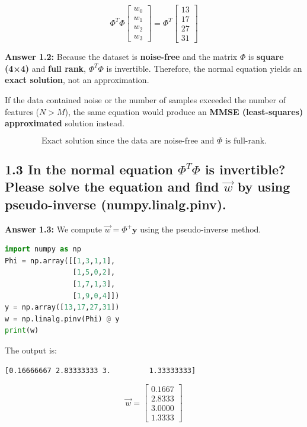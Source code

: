 \documentclass[12pt]{article}
\begin{document}
\[
\Phi^T \Phi 
\begin{bmatrix}
w_0 \\ w_1 \\ w_2 \\ w_3
\end{bmatrix}
=
\Phi^T
\begin{bmatrix}
13 \\ 17 \\ 27 \\ 31
\end{bmatrix}
\]

\textbf{Answer 1.2:}  
Because the dataset is \textbf{noise-free} and the matrix $\Phi$ is \textbf{square (4×4)} and \textbf{full rank},  
$\Phi^T\Phi$ is invertible. Therefore, the normal equation yields an \textbf{exact solution}, not an approximation.

If the data contained noise or the number of samples exceeded the number of features ($N > M$),  
the same equation would produce an \textbf{MMSE (least-squares) approximated} solution instead.

\[
\boxed{\text{Exact solution since the data are noise-free and }\Phi\text{ is full-rank.}}
\]

\subsection*{1.3
In the normal equation $\Phi^T\Phi$ is invertible? Please solve the equation and find $\vec{w}$ by using pseudo-inverse (numpy.linalg.pinv).}

\textbf{Answer 1.3:}  
We compute $\vec w = \Phi^+\mathbf y$ using the pseudo-inverse method.

\begin{lstlisting}[language=Python]
import numpy as np
Phi = np.array([[1,3,1,1],
                [1,5,0,2],
                [1,7,1,3],
                [1,9,0,4]])
y = np.array([13,17,27,31])
w = np.linalg.pinv(Phi) @ y
print(w)
\end{lstlisting}

\noindent
The output is:
\begin{lstlisting}
[0.16666667 2.83333333 3.         1.33333333]
\end{lstlisting}

\[
\boxed{
\vec w =
\begin{bmatrix}
0.1667\\
2.8333\\
3.0000\\
1.3333
\end{bmatrix}
}
\]
\end{document}

